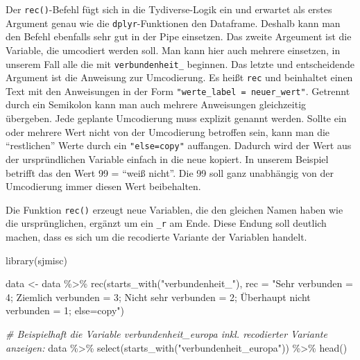 \documentclass[
]{book}
\newenvironment{Shaded}{\begin{snugshade}}{\end{snugshade}}
\newcommand{\AttributeTok}[1]{\textcolor[rgb]{0.77,0.63,0.00}{#1}}
\newcommand{\CommentTok}[1]{\textcolor[rgb]{0.56,0.35,0.01}{\textit{#1}}}
\newcommand{\FunctionTok}[1]{\textcolor[rgb]{0.00,0.00,0.00}{#1}}
\newcommand{\NormalTok}[1]{#1}
\newcommand{\OtherTok}[1]{\textcolor[rgb]{0.56,0.35,0.01}{#1}}
\newcommand{\SpecialCharTok}[1]{\textcolor[rgb]{0.00,0.00,0.00}{#1}}
\newcommand{\StringTok}[1]{\textcolor[rgb]{0.31,0.60,0.02}{#1}}
\begin{document}
Der \texttt{rec()}-Befehl fügt sich in die Tydiverse-Logik ein und erwartet als erstes Argument genau wie die \texttt{dplyr}-Funktionen den Dataframe. Deshalb kann man den Befehl ebenfalls sehr gut in der Pipe einsetzen. Das zweite Argeument ist die Variable, die umcodiert werden soll. Man kann hier auch mehrere einsetzen, in unserem Fall alle die mit \texttt{verbundenheit\_} beginnen. Das letzte und entscheidende Argument ist die Anweisung zur Umcodierung. Es heißt \texttt{rec} und beinhaltet einen Text mit den Anweisungen in der Form \texttt{"werte\_label\ =\ neuer\_wert"}. Getrennt durch ein Semikolon kann man auch mehrere Anweisungen gleichzeitig übergeben. Jede geplante Umcodierung muss explizit genannt werden. Sollte ein oder mehrere Wert nicht von der Umcodierung betroffen sein, kann man die ``restlichen'' Werte durch ein \texttt{"else=copy"} auffangen. Dadurch wird der Wert aus der urspründlichen Variable einfach in die neue kopiert. In unserem Beispiel betrifft das den Wert 99 = ``weiß nicht''. Die 99 soll ganz unabhängig von der Umcodierung immer diesen Wert beibehalten.

Die Funktion \texttt{rec()} erzeugt neue Variablen, die den gleichen Namen haben wie die ursprünglichen, ergänzt um ein \texttt{\_r} am Ende. Diese Endung soll deutlich machen, dass es sich um die recodierte Variante der Variablen handelt.

\begin{Shaded}
\begin{Highlighting}[]
\FunctionTok{library}\NormalTok{(sjmisc)}


\NormalTok{data }\OtherTok{\textless{}{-}}\NormalTok{ data }\SpecialCharTok{\%\textgreater{}\%} 
  \FunctionTok{rec}\NormalTok{(}\FunctionTok{starts\_with}\NormalTok{(}\StringTok{"verbundenheit\_"}\NormalTok{), }\AttributeTok{rec =} \StringTok{"Sehr verbunden = 4;}
\StringTok{                                             Ziemlich verbunden = 3;}
\StringTok{                                             Nicht sehr verbunden = 2; }
\StringTok{                                             Überhaupt nicht verbunden = 1;}
\StringTok{                                             else=copy"}\NormalTok{) }

\CommentTok{\# Beispielhaft die Variable verbundenheit\_europa inkl. recodierter Variante anzeigen:}
\NormalTok{data }\SpecialCharTok{\%\textgreater{}\%} 
  \FunctionTok{select}\NormalTok{(}\FunctionTok{starts\_with}\NormalTok{(}\StringTok{"verbundenheit\_europa"}\NormalTok{)) }\SpecialCharTok{\%\textgreater{}\%} 
  \FunctionTok{head}\NormalTok{()}
\end{Highlighting}
\end{Shaded}
\end{document}
